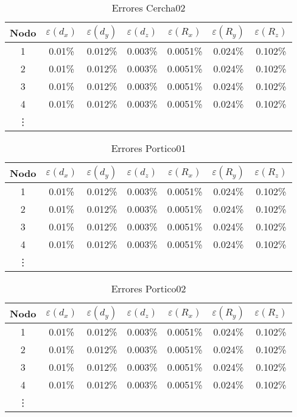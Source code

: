 \begin{table}[htbp]
    \centering
    \begin{tabular}{c|ccc|ccc}
        \hline 
        Nodo & $\varepsilon (d_x)$ & $\varepsilon (d_y)$ & $\varepsilon (d_z)$ & $\varepsilon (R_x)$ & $\varepsilon (R_y)$ & $\varepsilon (R_z)$ \\
        \hline 
        1 & 0.01\% & 0.012\% & 0.003\% & 0.0051\% & 0.024\% & 0.102\% \\
        2 & 0.01\% & 0.012\% & 0.003\% & 0.0051\% & 0.024\% & 0.102\% \\
        3 & 0.01\% & 0.012\% & 0.003\% & 0.0051\% & 0.024\% & 0.102\% \\
        4 & 0.01\% & 0.012\% & 0.003\% & 0.0051\% & 0.024\% & 0.102\% \\
        \vdots & & & & & & \\
        \hline 
    \end{tabular}
    \caption{Errores Cercha02}
    \label{tab:errorCercha02}
\end{table}

\begin{table}[htbp]
    \centering
    \begin{tabular}{c|ccc|ccc}
        \hline 
        Nodo & $\varepsilon (d_x)$ & $\varepsilon (d_y)$ & $\varepsilon (d_z)$ & $\varepsilon (R_x)$ & $\varepsilon (R_y)$ & $\varepsilon (R_z)$ \\
        \hline 
        1 & 0.01\% & 0.012\% & 0.003\% & 0.0051\% & 0.024\% & 0.102\% \\
        2 & 0.01\% & 0.012\% & 0.003\% & 0.0051\% & 0.024\% & 0.102\% \\
        3 & 0.01\% & 0.012\% & 0.003\% & 0.0051\% & 0.024\% & 0.102\% \\
        4 & 0.01\% & 0.012\% & 0.003\% & 0.0051\% & 0.024\% & 0.102\% \\
        \vdots & & & & & & \\
        \hline 
    \end{tabular}
    \caption{Errores Portico01}
    \label{tab:errorPortico01}
\end{table}

\begin{table}[htbp]
    \centering
    \begin{tabular}{c|ccc|ccc}
        \hline 
        Nodo & $\varepsilon (d_x)$ & $\varepsilon (d_y)$ & $\varepsilon (d_z)$ & $\varepsilon (R_x)$ & $\varepsilon (R_y)$ & $\varepsilon (R_z)$ \\
        \hline 
        1 & 0.01\% & 0.012\% & 0.003\% & 0.0051\% & 0.024\% & 0.102\% \\
        2 & 0.01\% & 0.012\% & 0.003\% & 0.0051\% & 0.024\% & 0.102\% \\
        3 & 0.01\% & 0.012\% & 0.003\% & 0.0051\% & 0.024\% & 0.102\% \\
        4 & 0.01\% & 0.012\% & 0.003\% & 0.0051\% & 0.024\% & 0.102\% \\
        \vdots & & & & & & \\
        \hline 
    \end{tabular}
    \caption{Errores Portico02}
    \label{tab:errorPortico02}
\end{table}

